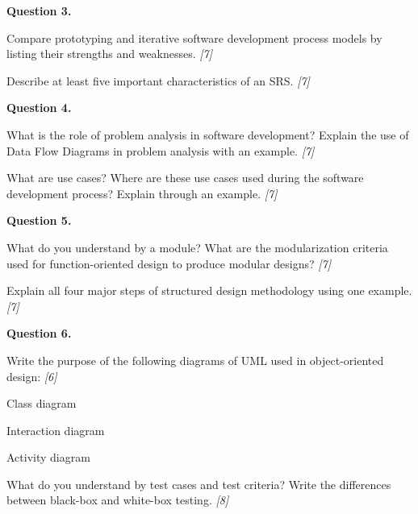 \documentclass[11pt,a4paper]{article}
\newcommand{\pts}[1]{\hfill   \textit{[#1]}}
\begin{document}
\noindent   \textbf{Question 3.}

\begin{parts}
  \item Compare prototyping and iterative software development process models by listing their strengths and weaknesses. \pts{7}
  \item Describe at least five important characteristics of an SRS. \pts{7}
\end{parts}

\medskip


\noindent   \textbf{Question 4.}

\begin{parts}
  \item What is the role of problem analysis in software development? Explain the use of Data Flow Diagrams in problem analysis with an example. \pts{7}
  \item What are use cases? Where are these use cases used during the software development process? Explain through an example. \pts{7}
\end{parts}

\medskip


\noindent   \textbf{Question 5.}

\begin{parts}
  \item What do you understand by a module? What are the modularization criteria used for function-oriented design to produce modular designs? \pts{7}
  \item Explain all four major steps of structured design methodology using one example. \pts{7}
\end{parts}

\medskip


\noindent   \textbf{Question 6.}

\begin{parts}
  \item Write the purpose of the following diagrams of UML used in object-oriented design: \pts{6}
  
\begin{parts}
    \item Class diagram
    \item Interaction diagram
    \item Activity diagram
  \end{parts}
  \item What do you understand by test cases and test criteria? Write the differences between black-box and white-box testing. \pts{8}
\end{parts}
\end{document}
